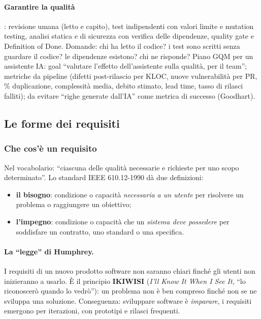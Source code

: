 \documentclass[a4paper,12pt]{article}
\begin{document}
\paragraph{Garantire la qualità}: revisione umana (letto e capito), test indipendenti con
valori limite e mutation testing, analisi statica e di sicurezza con verifica delle
dipendenze, quality gate e Definition of Done. Domande: chi ha letto il codice? i test sono
scritti senza guardare il codice? le dipendenze esistono? chi ne risponde? Piano GQM per un
assistente IA: goal ``valutare l'effetto dell'assistente sulla qualità, per il team'';
metriche da pipeline (difetti post-rilascio per KLOC, nuove vulnerabilità per PR,
\% duplicazione, complessità media, debito stimato, lead time, tasso di rilasci falliti);
da evitare ``righe generate dall'IA'' come metrica di successo (Goodhart).

\subsection{Le forme dei requisiti}

\subsubsection{Che cos'è un requisito}
Nel vocabolario: ``ciascuna delle qualità necessarie e richieste per uno scopo determinato''.
Lo standard IEEE 610.12-1990 dà due definizioni:
\begin{itemize}
  \item \textbf{il bisogno}: condizione o capacità \emph{necessaria a un utente} per risolvere
        un problema o raggiungere un obiettivo;
  \item \textbf{l'impegno}: condizione o capacità che un \emph{sistema deve possedere} per
        soddisfare un contratto, uno standard o una specifica.
\end{itemize}

\paragraph{La ``legge'' di Humphrey.} I requisiti di un nuovo prodotto software non saranno
chiari finché gli utenti non inizieranno a usarlo. È il principio \textbf{IKIWISI}
(\emph{I'll Know It When I See It}, ``lo riconoscerò quando lo vedrò''): un problema non è
ben compreso finché non se ne sviluppa una soluzione. Conseguenza: sviluppare software è
\emph{imparare}, i requisiti emergono per iterazioni, con prototipi e rilasci frequenti.
\end{document}
